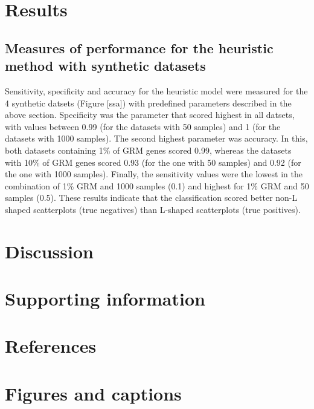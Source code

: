 \documentclass[10pt,letterpaper]{article}
\begin{document}
\hypertarget{results}{%
\section{Results}\label{results}}

\hypertarget{measures-of-performance-for-the-heuristic-method-with-synthetic-datasets}{%
\subsection{Measures of performance for the heuristic method with
synthetic
datasets}\label{measures-of-performance-for-the-heuristic-method-with-synthetic-datasets}}

Sensitivity, specificity and accuracy for the heuristic model were
measured for the 4 synthetic datsets (Figure {[}ssa{]}) with predefined
parameters described in the above section. Specificity was the parameter
that scored highest in all datsets, with values between 0.99 (for the
datasets with 50 samples) and 1 (for the datasets with 1000 samples).
The second highest parameter was accuracy. In this, both datasets
containing 1\% of GRM genes scored 0.99, whereas the datasets with 10\%
of GRM genes scored 0.93 (for the one with 50 samples) and 0.92 (for the
one with 1000 samples). Finally, the sensitivity values were the lowest
in the combination of 1\% GRM and 1000 samples (0.1) and highest for 1\%
GRM and 50 samples (0.5). These results indicate that the classification
scored better non-L shaped scatterplots (true negatives) than L-shaped
scatterplots (true positives).

\hypertarget{discussion}{%
\section{Discussion}\label{discussion}}

\hypertarget{supporting-information}{%
\section{Supporting information}\label{supporting-information}}

\hypertarget{references}{%
\section*{References}\label{references}}

\clearpage

\hypertarget{figures-and-captions}{%
\section{Figures and captions}\label{figures-and-captions}}
\end{document}
